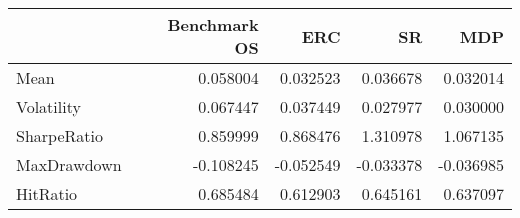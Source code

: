 \begin{tabular}{lrrrr}
\toprule
{} &  Benchmark OS &       ERC &        SR &       MDP \\
\midrule
Mean        &      0.058004 &  0.032523 &  0.036678 &  0.032014 \\
Volatility  &      0.067447 &  0.037449 &  0.027977 &  0.030000 \\
SharpeRatio &      0.859999 &  0.868476 &  1.310978 &  1.067135 \\
MaxDrawdown &     -0.108245 & -0.052549 & -0.033378 & -0.036985 \\
HitRatio    &      0.685484 &  0.612903 &  0.645161 &  0.637097 \\
\bottomrule
\end{tabular}
